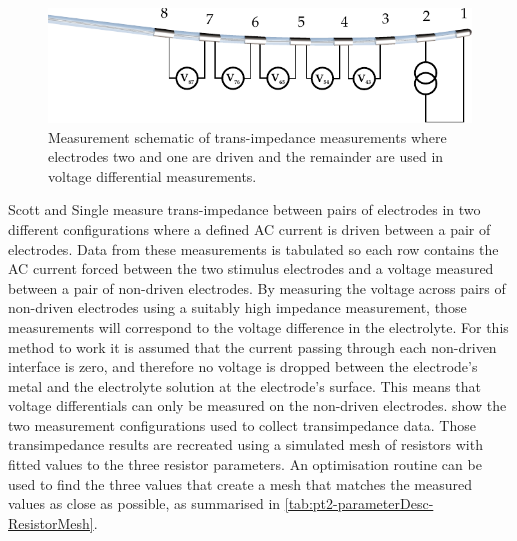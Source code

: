    \begin{figure}
      \centering
      \includegraphics{content/pt2/07-InterfaceModel/graphics/TransimpedanceMeasurements_Stim21}
      \caption{\label{fig:pt2-transimpedanceMeasurementDiagram_21Stim}Measurement schematic of trans-impedance measurements where electrodes two and one are driven and the remainder are used in voltage differential measurements.}
    \end{figure}

    Scott and Single measure trans-impedance between pairs of electrodes in two different configurations where a defined AC current is driven between a pair of electrodes.
    Data from these measurements is tabulated so each row contains the AC current forced between the two stimulus electrodes and a voltage measured between a pair of non-driven electrodes.
    By measuring the voltage across pairs of non-driven electrodes using a suitably high impedance measurement, those measurements will correspond to the voltage difference in the electrolyte.
    For this method to work it is assumed that the current passing through each non-driven interface is zero, and therefore no voltage is dropped between the electrode's metal and the electrolyte solution at the electrode's surface.
    This means that voltage differentials can only be measured on the non-driven electrodes.
     show the two measurement configurations used to collect transimpedance data.
    Those transimpedance results are recreated using a simulated mesh of resistors with fitted values to the three resistor parameters.
    An optimisation routine can be used to find the three values that create a mesh that matches the measured values as close as possible, as summarised in \cref{tab:pt2-parameterDesc-ResistorMesh}.

